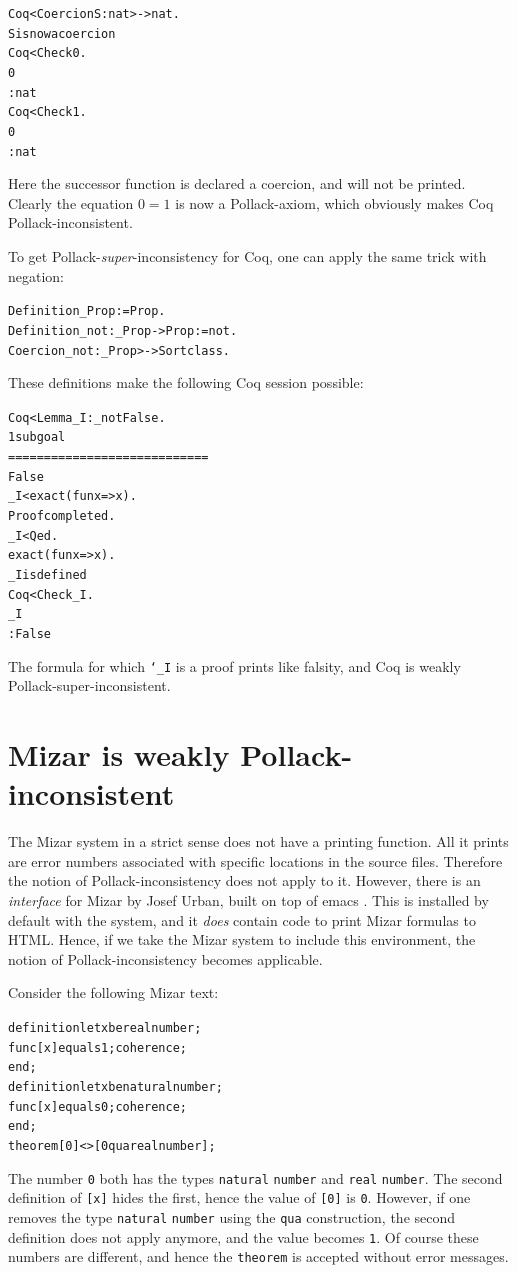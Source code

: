 \documentclass{entcs}
\begin{document}
\begin{alltt}
Coq < Coercion S : nat >-> nat.
S is now a coercion\medskip
Coq < Check 0.
0
     : nat\medskip
Coq < Check 1.
0
     : nat
\end{alltt}

\noindent
Here the successor function is declared a coercion, and will not
be printed.
Clearly the equation $0 = 1$ is now a Pollack-axiom,
which obviously makes Coq Pollack-inconsistent.

To get Pollack-\emph{super}-inconsistency for Coq, one can apply the same
trick with negation:

\begin{alltt}
Definition _Prop := Prop.
Definition _not : _Prop -> Prop := not.
Coercion _not : _Prop >-> Sortclass.\medskip
\end{alltt}

\noindent
These definitions make the following Coq session possible:

\begin{alltt}
Coq < Lemma _I : _not False.
1 subgoal\medskip
  ============================
   False\medskip
_I < exact (fun x => x).
Proof completed.\medskip
_I < Qed.
exact (fun x => x).
_I is defined\medskip
Coq < Check _I.
_I
     : False
\end{alltt}

\noindent
The formula for which \texttt{\char`\_I} is a proof prints
like falsity, and Coq is weakly Pollack-super-inconsistent.


\section{Mizar is weakly Pollack-inconsistent}
\label{Mizar}

The Mizar system \cite{muz:93,try:xx} in a strict sense does not have a printing
function.
All it prints are error numbers associated with specific locations in the source files.
Therefore the notion of Pollack-inconsistency does not apply to it.
However, there is an \emph{interface} for Mizar by Josef Urban,
built on top of emacs \cite{urb:06:1,urb:06:2}.
This is installed by default with the system,
and it \emph{does} contain code to print Mizar formulas to {\small HTML}.
Hence, if we take the Mizar system to include this environment,
the notion of Pollack-inconsistency becomes applicable.

Consider the following Mizar text:
\begin{alltt}
definition let x be real number;
  func [x] equals 1; coherence;
end;\medskip
definition let x be natural number;
  func [x] equals 0; coherence;
end;\medskip
theorem [0] <> [0 qua real number];
\end{alltt}
The number \texttt{0} both has the types \texttt{natural} \texttt{number}
and \texttt{real} \texttt{number}.
The second definition of \texttt{[x]} hides the first, hence
the value of \texttt{[0]} is \texttt{0}.
However, if one removes the type \texttt{natural} \texttt{number} using the \texttt{qua} construction,
the second definition does not apply anymore, and the value becomes \texttt{1}.
Of course these numbers are different, and hence the \texttt{theorem} is accepted
without error messages.
\end{document}
